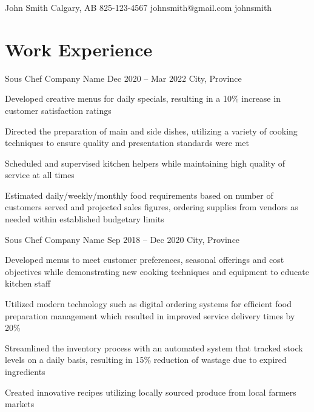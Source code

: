 \documentclass[letterpaper]{resume_config}
\begin{document}
\Header
    {John Smith} %
    {Calgary, AB} %
    {825-123-4567} %
    {johnsmith@gmail.com} %
    {johnsmith} %


\section{Work Experience}

\WorkExperience
    {Sous Chef} %
    {Company Name} %
    {Dec 2020 -- Mar 2022} %
    {City, Province} %
    {
        \item Developed creative menus for daily specials, resulting in a 10\% increase in customer satisfaction ratings
        \item Directed the preparation of main and side dishes, utilizing a variety of cooking techniques to ensure quality and presentation standards were met
        \item Scheduled and supervised kitchen helpers while maintaining high quality of service at all times
        \item Estimated daily/weekly/monthly food requirements based on number of customers served and projected sales figures, ordering supplies from vendors as needed within established budgetary limits
    } 

\WorkExperience
    {Sous Chef} %
    {Company Name} %
    {Sep 2018 -- Dec 2020} %
    {City, Province} %
    {
        \item Developed menus to meet customer preferences, seasonal offerings and cost objectives while demonstrating new cooking techniques and equipment to educate kitchen staff
        \item Utilized modern technology such as digital ordering systems for efficient food preparation management which resulted in improved service delivery times by 20\%
        \item Streamlined the inventory process with an automated system that tracked stock levels on a daily basis, resulting in 15\% reduction of wastage due to expired ingredients
        \item Created innovative recipes utilizing locally sourced produce from local farmers markets
    }
\end{document}
